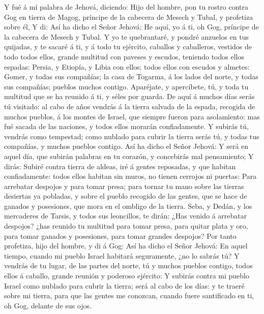  Y fué á mí palabra de Jehová, diciendo: 
Hijo del hombre, pon tu rostro contra Gog en tierra de Magog, príncipe
de la cabecera de Mesech y Tubal, y profetiza sobre él,  Y
di: Así ha dicho el Señor Jehová: He aquí, yo á ti, oh Gog, príncipe de
la cabecera de Mesech y Tubal.  Y yo te quebrantaré, y
pondré anzuelos en tus quijadas, y te sacaré á ti, y á todo tu ejército,
caballos y caballeros, vestidos de todo todos ellos, grande multitud con
paveses y escudos, teniendo todos ellos espadas:  Persia,
y Etiopía, y Libia con ellos; todos ellos con escudos y almetes:
 Gomer, y todas sus compañías; la casa de Togarma, á los
lados del norte, y todas sus compañías; pueblos muchos contigo.
 Aparéjate, y apercíbete, tú, y toda tu multitud que se ha
reunido á ti, y séles por guarda.  De aquí á muchos días
serás tú visitado: al cabo de años vendrás á la tierra salvada de la
espada, recogida de muchos pueblos, á los montes de Israel, que siempre
fueron para asolamiento: mas fué sacada de las naciones, y todos ellos
morarán confiadamente.  Y subirás tú, vendrás como
tempestad; como nublado para cubrir la tierra serás tú, y todas tus
compañías, y muchos pueblos contigo.  Así ha dicho el
Señor Jehová: Y será en aquel día, que subirán palabras en tu corazón, y
concebirás mal pensamiento;  Y dirás: Subiré contra
tierra de aldeas, iré á gentes reposadas, y que habitan confiadamente:
todos ellos habitan sin muros, no tienen cerrojos ni puertas:
 Para arrebatar despojos y para tomar presa; para tornar
tu mano sobre las tierras desiertas ya pobladas, y sobre el pueblo
recogido de las gentes, que se hace de ganados y posesiones, que mora en
el ombligo de la tierra.  Seba, y Dedán, y los mercaderes
de Tarsis, y todos sus leoncillos, te dirán: ¿Has venido á arrebatar
despojos? ¿has reunido tu multitud para tomar presa, para quitar plata y
oro, para tomar ganados y posesiones, para tomar grandes despojos?
 Por tanto profetiza, hijo del hombre, y di á Gog: Así ha
dicho el Señor Jehová: En aquel tiempo, cuando mi pueblo Israel habitará
seguramente, ¿no lo sabrás tú?  Y vendrás de tu lugar, de
las partes del norte, tú y muchos pueblos contigo, todos ellos á
caballo, grande reunión y poderoso ejército:  Y subirás
contra mi pueblo Israel como nublado para cubrir la tierra; será al cabo
de los días: y te traeré sobre mi tierra, para que las gentes me
conozcan, cuando fuere santificado en ti, oh Gog, delante de sus ojos.
